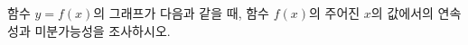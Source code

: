 함수 $y=f(x)$의 그래프가 다음과 같을 때, 함수 $f(x)$의 주어진 $x$의 값에서의 연속성과 미분가능성을 조사하시오.
\par\smallskip\begin{center}\resizebox{\ifdim\width>\linewidth\linewidth\else\width\fi}{!}{}\end{center}
\par\smallskip\begin{center}\resizebox{\ifdim\width>\linewidth\linewidth\else\width\fi}{!}{}\end{center}
